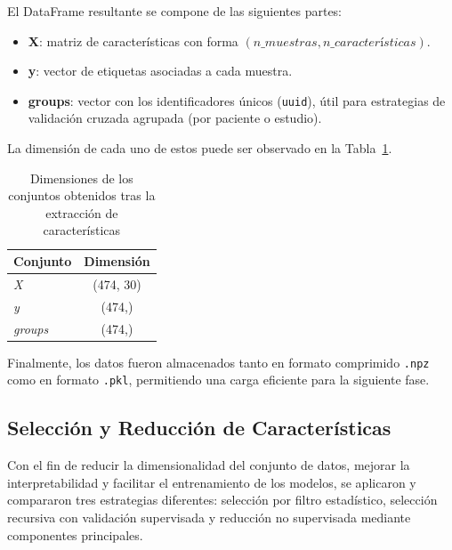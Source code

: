 \documentclass[conference]{IEEEtran}
\begin{document}
El DataFrame resultante se compone de las siguientes partes:
\begin{itemize}
    \item \textbf{X}: matriz de características con forma $(n\_muestras, n\_características)$.
    \item \textbf{y}: vector de etiquetas asociadas a cada muestra.
    \item \textbf{groups}: vector con los identificadores únicos (\texttt{uuid}), útil para estrategias de validación cruzada agrupada (por paciente o estudio).
\end{itemize}
La dimensión de cada uno de estos puede ser observado en la Tabla~\ref{tab:final_dimensions}.

\begin{table}[h]
\centering
\caption{Dimensiones de los conjuntos obtenidos tras la extracción de características}
\begin{tabular}{lc}
\toprule
\textbf{Conjunto} & \textbf{Dimensión} \\
\midrule
\textit{X} & (474, 30) \\
\textit{y} & (474,) \\
\textit{groups} & (474,) \\
\bottomrule
\end{tabular}
\label{tab:final_dimensions}
\end{table}

Finalmente, los datos fueron almacenados tanto en formato comprimido \texttt{.npz} como en formato \texttt{.pkl}, permitiendo una carga eficiente para la siguiente fase.








\subsection{Selección y Reducción de Características}

Con el fin de reducir la dimensionalidad del conjunto de datos, mejorar la interpretabilidad y facilitar el entrenamiento de los modelos, se aplicaron y compararon tres estrategias diferentes: selección por filtro estadístico, selección recursiva con validación supervisada y reducción no supervisada mediante componentes principales.
\end{document}
